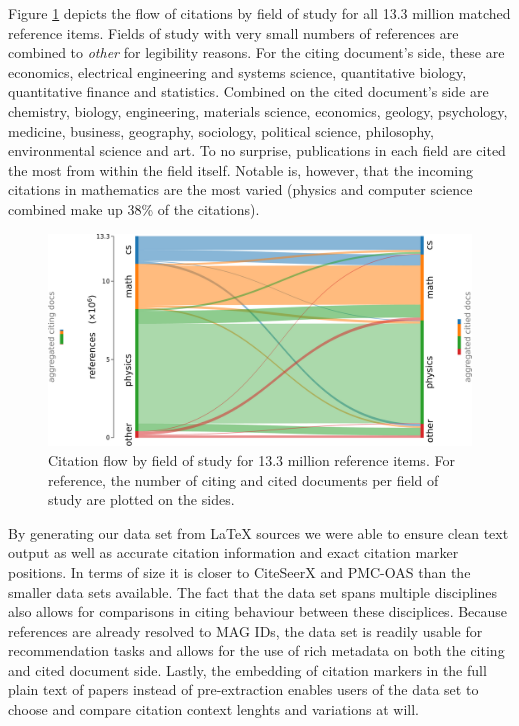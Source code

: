 Figure \ref{fig:sankey} depicts the flow of citations by field of study for all 13.3 million matched reference items. Fields of study with very small numbers of references are combined to \emph{other} for legibility reasons. For the citing document's side, these are economics, electrical engineering and systems science, quantitative biology, quantitative finance and statistics. Combined on the cited document's side are chemistry, biology, engineering, materials science, economics, geology, psychology, medicine, business, geography, sociology, political science, philosophy, environmental science and art. To no surprise, publications in each field are cited the most from within the field itself. Notable is, however, that the incoming citations in mathematics are the most varied (physics and computer science combined make up 38\% of the citations).

\begin{figure}
  \centering
    \includegraphics[width=\textwidth]{figures/dataset/citation_relation_sankey.pdf}
  \caption[Citation flow by field of study for 13.3 million reference items.]{Citation flow by field of study for 13.3 million reference items. For reference, the number of citing and cited documents per field of study are plotted on the sides.}
  \label{fig:sankey}
\end{figure}

By generating our data set from \LaTeX{} sources we were able to ensure clean text output as well as accurate citation information and exact citation marker positions. In terms of size it is closer to CiteSeerX and PMC-OAS than the smaller data sets available. The fact that the data set spans multiple disciplines also allows for comparisons in citing behaviour between these disciplices. Because references are already resolved to MAG IDs, the data set is readily usable for recommendation tasks and allows for the use of rich metadata on both the citing and cited document side. Lastly, the embedding of citation markers in the full plain text of papers instead of pre-extraction enables users of the data set to choose and compare citation context lenghts and variations at will.
